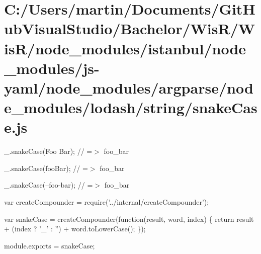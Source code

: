 \hypertarget{_c_1_2_users_2martin_2_documents_2_git_hub_visual_studio_2_bachelor_2_wis_r_2_wis_r_2node_module84a5676d68d610d57011e5b68c0e1326}{}\section{C\+:/\+Users/martin/\+Documents/\+Git\+Hub\+Visual\+Studio/\+Bachelor/\+Wis\+R/\+Wis\+R/node\+\_\+modules/istanbul/node\+\_\+modules/js-\/yaml/node\+\_\+modules/argparse/node\+\_\+modules/lodash/string/snake\+Case.\+js}
\+\_\+.\+snake\+Case(\textquotesingle{}Foo Bar\textquotesingle{}); // =$>$ \textquotesingle{}foo\+\_\+bar\textquotesingle{}

\+\_\+.\+snake\+Case(\textquotesingle{}foo\+Bar\textquotesingle{}); // =$>$ \textquotesingle{}foo\+\_\+bar\textquotesingle{}

\+\_\+.\+snake\+Case(\textquotesingle{}--foo-\/bar\textquotesingle{}); // =$>$ \textquotesingle{}foo\+\_\+bar\textquotesingle{}


\begin{DoxyCodeInclude}
var createCompounder = require(\textcolor{stringliteral}{'../internal/createCompounder'});

var snakeCase = createCompounder(\textcolor{keyword}{function}(result, word, index) \{
  \textcolor{keywordflow}{return} result + (index ? \textcolor{charliteral}{'\_'} : \textcolor{stringliteral}{''}) + word.toLowerCase();
\});

module.exports = snakeCase;
\end{DoxyCodeInclude}
 